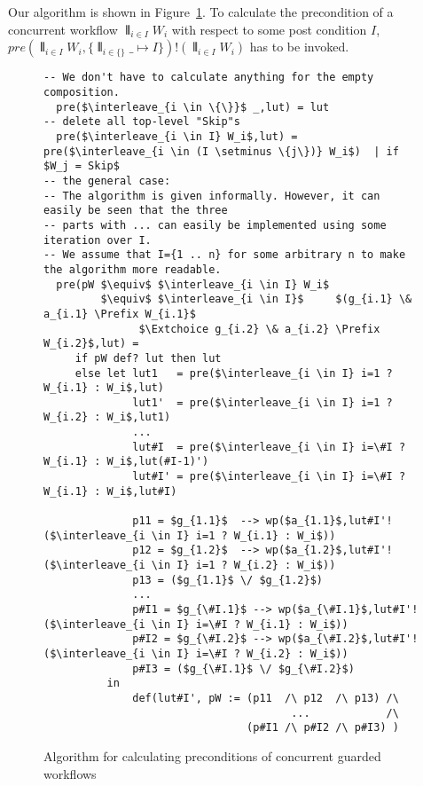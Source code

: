 \documentclass[11pt]{article}
\begin{document}
Our algorithm is shown in Figure~\ref{fig:algorithm_nondisjoint}. To calculate the precondition of a concurrent workflow $\interleave_{i \in I} W_i$ with respect to some post condition $I$, $pre(\interleave_{i \in I} W_i,\{\interleave_{i \in \{\}} \_ \mapsto I\}) ! (\interleave_{i \in I} W_i)$ has to be invoked.

\begin{figure}
\begin{lstlisting}[basicstyle=\footnotesize,mathescape]
-- We don't have to calculate anything for the empty composition.
  pre($\interleave_{i \in \{\}}$ _,lut) = lut
-- delete all top-level "Skip"s
  pre($\interleave_{i \in I} W_i$,lut) = pre($\interleave_{i \in (I \setminus \{j\})} W_i$)  | if $W_j = Skip$
-- the general case:
-- The algorithm is given informally. However, it can easily be seen that the three
-- parts with ... can easily be implemented using some iteration over I.
-- We assume that I={1 .. n} for some arbitrary n to make the algorithm more readable.                         
  pre(pW $\equiv$ $\interleave_{i \in I} W_i$    
         $\equiv$ $\interleave_{i \in I}$     $(g_{i.1} \& a_{i.1} \Prefix W_{i.1}$
               $\Extchoice g_{i.2} \& a_{i.2} \Prefix W_{i.2}$,lut) =
     if pW def? lut then lut
     else let lut1   = pre($\interleave_{i \in I} i=1 ? W_{i.1} : W_i$,lut)
              lut1'  = pre($\interleave_{i \in I} i=1 ? W_{i.2} : W_i$,lut1)
              ...
              lut#I  = pre($\interleave_{i \in I} i=\#I ? W_{i.1} : W_i$,lut(#I-1)')
              lut#I' = pre($\interleave_{i \in I} i=\#I ? W_{i.1} : W_i$,lut#I)
                            
              p11 = $g_{1.1}$  --> wp($a_{1.1}$,lut#I'!($\interleave_{i \in I} i=1 ? W_{i.1} : W_i$))
              p12 = $g_{1.2}$  --> wp($a_{1.2}$,lut#I'!($\interleave_{i \in I} i=1 ? W_{i.2} : W_i$))
              p13 = ($g_{1.1}$ \/ $g_{1.2}$)
              ...
              p#I1 = $g_{\#I.1}$ --> wp($a_{\#I.1}$,lut#I'!($\interleave_{i \in I} i=\#I ? W_{i.1} : W_i$))
              p#I2 = $g_{\#I.2}$ --> wp($a_{\#I.2}$,lut#I'!($\interleave_{i \in I} i=\#I ? W_{i.2} : W_i$))
              p#I3 = ($g_{\#I.1}$ \/ $g_{\#I.2}$)
          in 
              def(lut#I', pW := (p11  /\ p12  /\ p13) /\ 
                                       ...            /\ 
                                (p#I1 /\ p#I2 /\ p#I3) )                             
\end{lstlisting}
\caption{Algorithm for calculating preconditions of concurrent guarded workflows}
\label{fig:algorithm_nondisjoint}
\end{figure}
\end{document}
